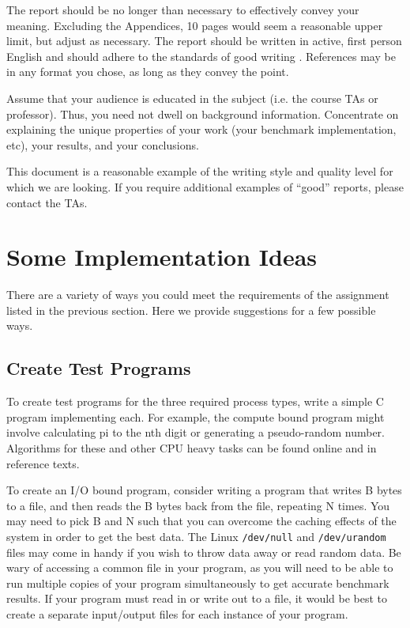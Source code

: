 \documentclass[12pt]{article}
\begin{document}
The report should be no longer than necessary to effectively convey your
meaning. Excluding the Appendices, 10 pages would seem a reasonable
upper limit, but adjust as necessary. The report should be written in
active, first person English and should adhere to the standards of good
writing \cite{StrunkWhite,K&R}. References may be in any format you chose,
as long as they convey the point.

Assume that your audience is educated in the subject
(i.e. the course TAs or professor). Thus, you need not dwell on
background information. Concentrate on explaining the unique properties of
your work (your benchmark implementation, etc), your results, and your
conclusions.

This document is a reasonable example of the writing
style and quality level for which we are looking. If you require
additional examples of ``good'' reports, please contact the TAs.

\section{Some Implementation Ideas}

There are a variety of ways you could meet the requirements of the
assignment listed in the previous section. Here we provide suggestions
for a few possible ways.

\subsection{Create Test Programs}

To create test programs for the three required process types,
write a simple C program implementing
each. For example, the compute bound program might involve
calculating pi to the nth digit or generating a pseudo-random number.
Algorithms for these and other CPU
heavy tasks can be found online and in reference texts.

To create an
I/O bound program, consider writing a program that writes B bytes to a
file, and then reads the B bytes back from the file, repeating N
times. You may need to pick B and N such that you can overcome the
caching effects of the system in order to get the best data. The Linux
\texttt{/dev/null} and \texttt{/dev/urandom} files may come in handy
if you wish to throw data away or read random data. Be wary of
accessing a common file in your program, as you will need to be
able to run multiple copies of your program simultaneously to get
accurate benchmark results. If your program must read in or write out
to a file, it would be best to create a separate input/output files for
each instance of your program.
\end{document}
